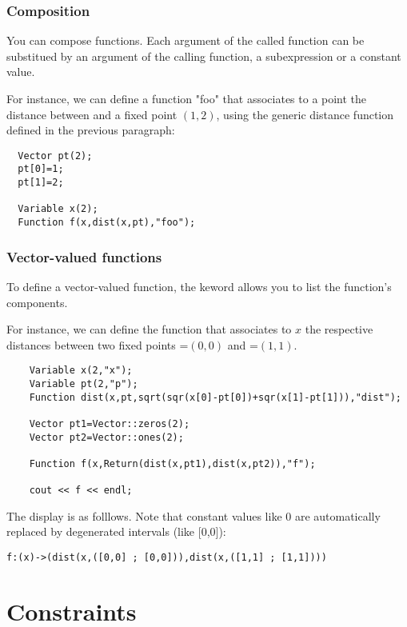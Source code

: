 \subsubsection{Composition}

You can compose functions. Each argument of the called function can be substitued
by an argument of the calling function, a subexpression or a constant value.

For instance, we can define a function "foo" that associates to
a point  the distance between  and a fixed point $(1,2)$,
using the generic distance function defined in the previous paragraph:

\begin{lstlisting}
  Vector pt(2);
  pt[0]=1;
  pt[1]=2;

  Variable x(2);
  Function f(x,dist(x,pt),"foo");
\end{lstlisting}

\subsubsection{Vector-valued functions}

To define a vector-valued function, the  keword allows
you to list the function's components.

For instance, we can define the function that associates to $x$ the 
respective distances between two fixed points =$(0,0)$ and =$(1,1)$.

\begin{lstlisting}	
	Variable x(2,"x");
	Variable pt(2,"p");
	Function dist(x,pt,sqrt(sqr(x[0]-pt[0])+sqr(x[1]-pt[1])),"dist");

	Vector pt1=Vector::zeros(2);
	Vector pt2=Vector::ones(2);

	Function f(x,Return(dist(x,pt1),dist(x,pt2)),"f");

	cout << f << endl;
\end{lstlisting}

The display is as folllows. Note that constant values like 0 are automatically replaced
by degenerated intervals (like [0,0]):
\begin{verbatim}
f:(x)->(dist(x,([0,0] ; [0,0])),dist(x,([1,1] ; [1,1])))
\end{verbatim}

\section{Constraints}


